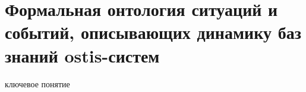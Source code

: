 \begin{comment}
\begin{SCn}
\scnheader{следует отличать*}
\begin{scnhaselementset}
\scnitem{темпоральное совпадение*}
	\begin{scnindent}
	\scniselement{отношение эквивалентности}
	\end{scnindent}
	\scnitem{одновременность\scnsupergroupsign}
	\begin{scnindent}
	\scnidtf{фактор-множество для отношения темпоральное совпадение*}
	\end{scnindent}
\end{scnhaselementset}
		
\scnheader{длительность\scnsupergroupsign}
\scnidtf{класс временных сущностей, имеющих одинаковую длительность\scnsupergroupsign}
\scniselement{параметр}
\scnhaselement{тысячелетие}
\scnhaselement{век}
\scnhaselement{год}
\scnhaselement{месяц}
\scnhaselement{день}
\scnhaselement{час}
\scnhaselement{минута}
\scnhaselement{секунда}
\end{SCn}

Каждый элемент множества \textbf{\textit{длительность}} представляет собой класс \textit{временных сущностей}, у которых совпадает длительность их существования. Конкретное значение данного \textit{параметра} может быть как \textit{точной величиной}, так и \textit{неточной величиной} или \textit{интервальной величиной}.
\end{comment}

\section{Формальная онтология ситуаций и событий, описывающих динамику баз знаний ostis-систем}
\label{sec_top_ontologies_dynamic}

\begin{SCn}
\begin{scnrelfromlist}{ключевое понятие}
\end{scnrelfromlist}
\end{SCn}	

